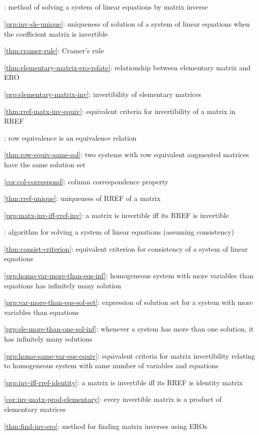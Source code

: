 \subsection*{}
\item {}: method of solving a system of linear
equations by matrix inverse
\item \cref{prp:inv-sle-unique}: uniqueness of solution of a system of linear equations when the coefficient matrix is invertible
\item \cref{thm:cramer-rule}: Cramer's rule
\item \cref{thm:elementary-matrix-ero-relate}: relationship between elementary matrix and ERO
\item \cref{prp:elementary-matrix-inv}: invertibility of elementary matrices
\item \cref{thm:rref-matx-inv-equiv}: equivalent criteria for invertibility of a matrix in RREF
\item {}: row equivalence is an equivalence relation
\item \cref{thm:row-equiv-same-sol}: two systems with row equivalent augmented matrices have the same solution set
\item \cref{cor:col-correspond}: column correspondence property
\item \cref{thm:rref-unique}: uniqueness of RREF of a matrix
\item \cref{prp:matx-inv-iff-rref-inv}: a matrix is invertible iff its RREF is invertible
\item {}: algorithm for solving a system of linear equations (assuming consistency)
\item \cref{thm:consist-criterion}: equivalent criterion for consistency of a system of linear equations
\item \cref{prp:homo-var-more-than-eqs-inf}: homogeneous system with more variables than equations has infinitely many solution
\item \cref{prp:var-more-than-eqs-sol-set}: expression of solution set for a system with more variables than equations
\item \cref{prp:sle-more-than-one-sol-inf}: whenever a system has more than one solution, it has infinitely many solutions
\item \cref{prp:homo-same-var-eqs-equiv}: equivalent criteria for matrix invertibility relating to homogeneous system with same number of variables and equations
\item \cref{prp:inv-iff-rref-identity}: a matrix is invertible iff its RREF is identity matrix
\item \cref{cor:inv-matx-prod-elementary}: every invertible matrix is a product of elementary matrices
\item \cref{thm:find-inv-ero}: method for finding matrix inverses using EROs
